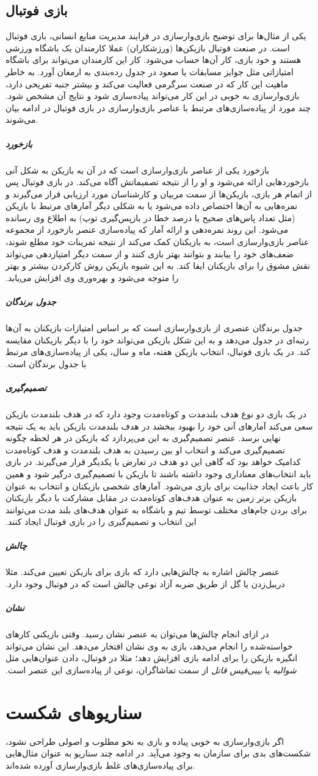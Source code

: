 \subsection{بازی فوتبال}
یکی از مثال‌ها برای توضیح بازی‌وارسازی در فرایند مدیریت منابع انسانی، بازی فوتبال است. در صنعت فوتبال بازیکن‌ها (ورزشکاران) عملا کارمندان یک باشگاه ورزشی هستند و خود بازی، کار آن‌ها حساب می‌شود. کار این کارمندان می‌تواند برای باشگاه امتیازاتی مثل جوایز مسابقات یا صعود در جدول رده‌بندی به ارمغان آورد.
به خاطر ماهیت این کار که در صنعت سرگرمی فعالیت می‌کند و بیشتر جنبه تفریحی دارد، بازی‌وارسازی به خوبی در این کار می‌تواند پیاده‌سازی شود و نتایج آن مشخص شود. چند مورد از پیاده‌سازی‌های مرتبط با عناصر بازی‌وارسازی در بازی فوتبال در ادامه بیان می‌شوند.
\subparagraph{بازخورد}‫
بازخورد یکی از عناصر بازی‌وارسازی است که در آن به بازیکن به شکل آنی بازخوردهایی ارائه می‌شود و او را از نتیجه تصمیماتش آگاه می‌کند. در بازی فوتبال پس از اتمام هر بازی، بازیکن‌ها از سمت مربیان و کارشناسان مورد ارزیابی قرار می‌گیرند و نمره‌هایی به آن‌ها اختصاص داده می‌شود یا به شکلی دیگر آمارهای مرتبط با بازیکن (مثل تعداد پاس‌های صحیح یا درصد خطا در بازپس‌گیری توپ) به اطلاع وی رسانده می‌شود. این روند نمره‌دهی و ارائه آمار که پیاده‌سازی عنصر بازخورد از مجموعه عناصر بازی‌وارسازی است، به بازیکنان کمک می‌کند از نتیجه تمرینات خود مطلع شوند، ضعف‌های خود را بیابند و بتوانند بهتر بازی کنند و از سمت دیگر امتیازدهی می‌تواند نقش مشوق را برای بازیکنان ایفا کند. به این شیوه بازیکن روش کارکردن بیشتر و بهتر را متوجه می‌شود و بهره‌وری وی افزایش می‌یابد.
\subparagraph{جدول برندگان}‫
جدول برندگان عنصری از بازی‌وارسازی است که بر اساس امتیازات بازیکنان به آن‌ها رتبه‌ای در جدول می‌دهد و به این شکل بازیکن می‌تواند خود را با دیگر بازیکنان مقایسه کند. در یک بازی فوتبال، انتخاب بازیکن هفته، ماه و سال، یکی از پیاده‌سازی‌های مرتبط با جدول برندگان است.
\subparagraph{تصمیم‌گیری}‫
در یک بازی دو نوع هدف بلندمدت و کوتاه‌مدت وجود دارد که در هدف بلندمدت بازیکن سعی می‌کند آمارهای آنی خود را بهبود ببخشد در هدف بلندمدت بازیکن باید به یک نتیجه نهایی برسد. عنصر تصمیم‌گیری به این می‌پردازد که بازیکن در هر لحظه چگونه تصمیم‌گیری می‌کند و انتخاب او بین رسیدن به هدف بلندمدت و هدف کوتاه‌مدت کدامیک خواهد بود که گاهی این دو هدف در تعارض با یکدیگر قرار می‌گیرند. در بازی باید انتخاب‌های معناداری وجود داشته باشند تا بازیکن با تصمیم‌گیری درگیر شود و همین کار باعث ایجاد جذابیت برای بازی می‌شود. آمارهای شخصی بازیکنان و انتخاب به عنوان بازیکن برتر زمین به عنوان هدف‌های کوتاه‌مدت در مقابل مشارکت با دیگر بازیکنان برای بردن جام‌های مختلف توسط تیم و باشگاه به عنوان هدف‌های بلند مدت می‌توانند این انتخاب و تصمیم‌گیری را در بازی فوتبال ایجاد کنند.
\subparagraph{چالش}‫
عنصر چالش اشاره به چالش‌هایی دارد که بازی برای بازیکن تعیین می‌کند. مثلا دریبل‌زدن یا گل از طریق ضربه آزاد نوعی چالش است که در فوتبال وجود دارد.
\subparagraph{نشان}‫
در ازای انجام چالش‌ها می‌توان به عنصر نشان رسید. وقتی بازیکنی کارهای خواسته‌شده را انجام می‌دهد، بازی به وی نشان افتخار می‌دهد. این نشان می‌تواند انگیزه بازیکن را برای ادامه بازی افزایش دهد؛ مثلا در فوتبال، دادن عنوان‌هایی مثل \emph{شوالیه} یا \emph{بیبی‌فیس قاتل} از سمت تماشاگران، نوعی از پیاده‌سازی این عنصر است.
\section{سناریوهای شکست}
اگر بازی‌وارسازی به خوبی پیاده و بازی به نحو مطلوب و اصولی طراحی نشود، شکست‌های بدی برای سازمان به وجود می‌آید. در ادامه چند سناریو به عنوان مثال‌هایی برای پیاده‌سازی‌های غلط بازی‌وارسازی آورده شده‌اند.
